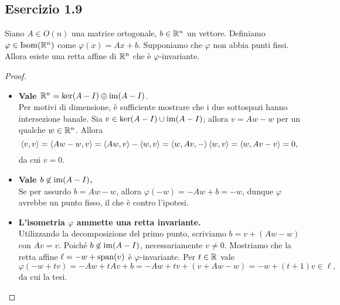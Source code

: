 
\subsection*{Esercizio 1.9}
\begin{lemma*}
Siano $A\in O(n)$ una matrice ortogonale, $b\in\mathbb{R}^n$ un vettore. Definiamo $\varphi\in\operatorname{Isom}(\mathbb{R}^n)$ come $\varphi(x)=Ax+b$. Supponiamo che $\varphi$ non abbia punti fissi. Allora esiste una retta affine di $\mathbb{R}^n$ che è $\varphi$-invariante.
\end{lemma*}
\begin{proof}\leavevmode
\begin{itemize}
\item\textbf{Vale $\mathbb{R}^n=\ker(A-I)\oplus\operatorname{im}(A-I)$}.\\
Per motivi di dimensione, è sufficiente mostrare che i due sottospazi hanno intersezione banale. Sia $v\in\ker(A-I)\cup\operatorname{im}(A-I)$; allora $v=Aw-w$ per un qualche $w\in\mathbb{R}^n$. Allora
\[
\left\langle v,v\right\rangle=\left\langle Aw-w,v\right\rangle=\left\langle Aw,v\right\rangle-\left\langle w,v\right\rangle=\left\langle w,Av,-\right\rangle\left\langle w,v\right\rangle=\left\langle w,Av-v\right\rangle=0,
\]
da cui $v=0$.
\item\textbf{Vale $b\not\in\operatorname{im}(A-I)$.}\\
Se per assurdo $b=Aw-w$, allora $\varphi(-w)=-Aw+b=-w$, dunque $\varphi$ avrebbe un punto fisso, il che è contro l'ipotesi.
\item\textbf{L'isometria $\varphi$ ammette una retta invariante.}\\
Utilizzando la decomposizione del primo punto, scriviamo $b=v+(Aw-w)$ con $Av=v$. Poiché $b\not\in\operatorname{im}(A-I)$, necessariamente $v\neq 0$. Mostriamo che la retta affine $\ell=-w+\operatorname{span}(v)$ è $\varphi$-invariante. Per $t\in\mathbb{R}$ vale
\[
\varphi(-w+tv)=-Aw+tAv+b=-Aw+tv+(v+Aw-w)=-w+(t+1)v\in\ell,
\]
da cui la tesi.\qedhere
\end{itemize}
\end{proof}

